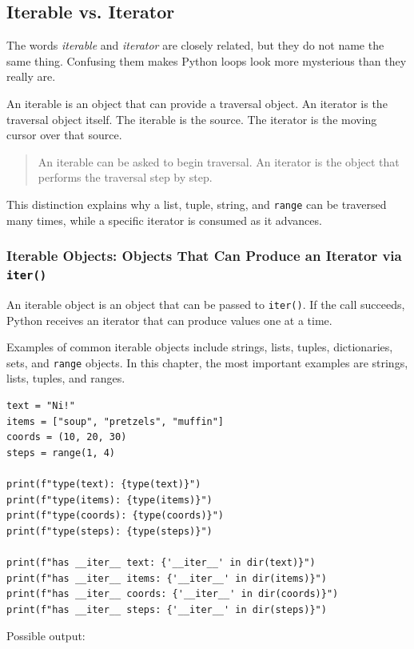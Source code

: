 \subsection{Iterable vs. Iterator}

The words \emph{iterable} and \emph{iterator} are closely related, but they do not name the same thing. Confusing them makes Python loops look more mysterious than they really are.

An iterable is an object that can provide a traversal object. An iterator is the traversal object itself. The iterable is the source. The iterator is the moving cursor over that source.

\begin{quote}
An iterable can be asked to begin traversal. An iterator is the object that performs the traversal step by step.
\end{quote}

This distinction explains why a list, tuple, string, and \texttt{range} can be traversed many times, while a specific iterator is consumed as it advances.

\subsubsection{Iterable Objects: Objects That Can Produce an Iterator via \texttt{iter()}}

An iterable object is an object that can be passed to \texttt{iter()}. If the call succeeds, Python receives an iterator that can produce values one at a time.

Examples of common iterable objects include strings, lists, tuples, dictionaries, sets, and \texttt{range} objects. In this chapter, the most important examples are strings, lists, tuples, and ranges.

\begin{verbatim}
text = "Ni!"
items = ["soup", "pretzels", "muffin"]
coords = (10, 20, 30)
steps = range(1, 4)

print(f"type(text): {type(text)}")
print(f"type(items): {type(items)}")
print(f"type(coords): {type(coords)}")
print(f"type(steps): {type(steps)}")

print(f"has __iter__ text: {'__iter__' in dir(text)}")
print(f"has __iter__ items: {'__iter__' in dir(items)}")
print(f"has __iter__ coords: {'__iter__' in dir(coords)}")
print(f"has __iter__ steps: {'__iter__' in dir(steps)}")
\end{verbatim}

Possible output:

